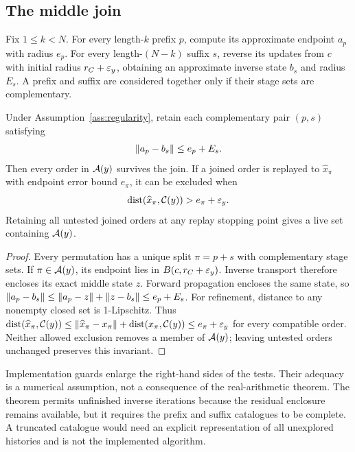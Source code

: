 \subsection{The middle join}
Fix $1\leq k<N$. For every length-$k$ prefix $p$, compute its approximate endpoint $a_p$ with radius $e_p$. For every length-$(N-k)$ suffix $s$, reverse its updates from $c$ with initial radius $r_C+\varepsilon_y$, obtaining an approximate inverse state $b_s$ and radius $E_s$. A prefix and suffix are considered together only if their stage sets are complementary.

\begin{theorem}\label{thm:no-loss}
Under Assumption~\ref{ass:regularity}, retain each complementary pair $(p,s)$ satisfying
\begin{equation}\label{eq:join}
 \left\lVert a_p-b_s\right\rVert\leq e_p+E_s.
\end{equation}
Then every order in $\mathcal{A}(y)$ survives the join. If a joined order is replayed to $\widehat x_\pi$ with endpoint error bound $e_\pi$, it can be excluded when
\begin{equation}\label{eq:exclude}
 \operatorname{dist}(\widehat x_\pi,\mathcal{C}(y))>e_\pi+\varepsilon_y.
\end{equation}
Retaining all untested joined orders at any replay stopping point gives a live set containing $\mathcal{A}(y)$.
\end{theorem}
\begin{proof}
Every permutation has a unique split $\pi=p+s$ with complementary stage sets. If $\pi\in\mathcal{A}(y)$, its endpoint lies in $B(c,r_C+\varepsilon_y)$. Inverse transport therefore encloses its exact middle state $z$. Forward propagation encloses the same state, so $\left\lVert a_p-b_s\right\rVert\leq\left\lVert a_p-z\right\rVert+\left\lVert z-b_s\right\rVert\leq e_p+E_s$. For refinement, distance to any nonempty closed set is 1-Lipschitz. Thus
$\operatorname{dist}(\widehat x_\pi,\mathcal{C}(y))\leq\left\lVert\widehat x_\pi-x_\pi\right\rVert+\operatorname{dist}(x_\pi,\mathcal{C}(y))\leq e_\pi+\varepsilon_y$ for every compatible order. Neither allowed exclusion removes a member of $\mathcal{A}(y)$; leaving untested orders unchanged preserves this invariant.
\end{proof}
Implementation guards enlarge the right-hand sides of the tests. Their adequacy is a numerical assumption, not a consequence of the real-arithmetic theorem. The theorem permits unfinished inverse iterations because the residual enclosure remains available, but it requires the prefix and suffix catalogues to be complete. A truncated catalogue would need an explicit representation of all unexplored histories and is not the implemented algorithm.

